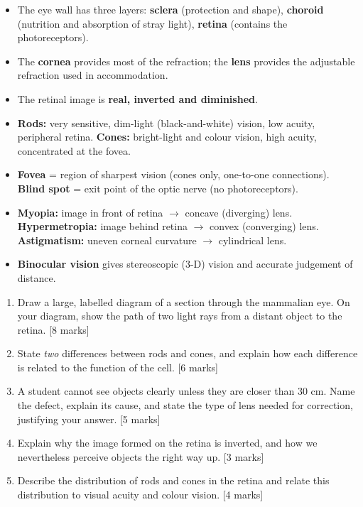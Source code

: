 \documentclass[11pt]{article}
\begin{document}
\begin{aretenir}
\begin{itemize}
\item The eye wall has three layers: \textbf{sclera} (protection and shape), \textbf{choroid} (nutrition and absorption of stray light), \textbf{retina} (contains the photoreceptors).
\item The \textbf{cornea} provides most of the refraction; the \textbf{lens} provides the adjustable refraction used in accommodation.
\item The retinal image is \textbf{real, inverted and diminished}.
\item \textbf{Rods:} very sensitive, dim-light (black-and-white) vision, low acuity, peripheral retina. \textbf{Cones:} bright-light and colour vision, high acuity, concentrated at the fovea.
\item \textbf{Fovea} = region of sharpest vision (cones only, one-to-one connections). \textbf{Blind spot} = exit point of the optic nerve (no photoreceptors).
\item \textbf{Myopia:} image in front of retina $\to$ concave (diverging) lens. \textbf{Hypermetropia:} image behind retina $\to$ convex (converging) lens. \textbf{Astigmatism:} uneven corneal curvature $\to$ cylindrical lens.
\item \textbf{Binocular vision} gives stereoscopic (3-D) vision and accurate judgement of distance.
\end{itemize}
\end{aretenir}

\begin{exercice}
\begin{enumerate}
\item Draw a large, labelled diagram of a section through the mammalian eye. On your diagram, show the path of two light rays from a distant object to the retina. [8 marks]
\item State \emph{two} differences between rods and cones, and explain how each difference is related to the function of the cell. [6 marks]
\item A student cannot see objects clearly unless they are closer than 30 cm. Name the defect, explain its cause, and state the type of lens needed for correction, justifying your answer. [5 marks]
\item Explain why the image formed on the retina is inverted, and how we nevertheless perceive objects the right way up. [3 marks]
\item Describe the distribution of rods and cones in the retina and relate this distribution to visual acuity and colour vision. [4 marks]
\end{enumerate}
\end{exercice}
\end{document}
